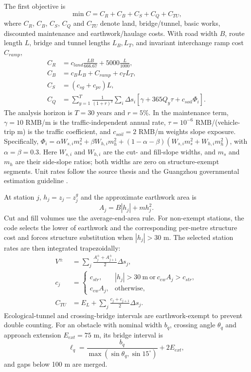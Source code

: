\documentclass[preprint,12pt]{elsarticle}
\begin{document}
The first objective is
\begin{equation}
\min C=C_R+C_B+C_S+C_Q+C_{TU},
\label{eq:lcc}
\end{equation}
where $C_R$, $C_B$, $C_S$, $C_Q$ and $C_{TU}$ denote land, bridge/tunnel, basic works, discounted maintenance and earthwork/haulage costs. With road width $B$, route length $L$, bridge and tunnel lengths $L_B,L_T$, and invariant interchange ramp cost $C_{ramp}$,
\begin{align}
C_R&=c_{land}\frac{LB}{666.67}+5000\frac{L}{1000},\\
C_B&=c_BL_B+C_{ramp}+c_TL_T,\\
C_S&=(c_{sg}+c_{pv})L,\label{eq:lccparts}\\
C_Q&=\sum_{y=1}^{T}\frac{1}{(1+r)^y}
\sum_i\Delta s_i[\gamma+365Q_y\tau+c_{soil}\Phi_i].
\end{align}
The analysis horizon is $T=30$ years and $r=5\%$. In the maintenance term, $\gamma=10$ RMB/m is the traffic-independent annual rate, $\tau=10^{-6}$ RMB/(vehicle-trip m) is the traffic coefficient, and $c_{soil}=2$ RMB/m weights slope exposure. Specifically, $\Phi_i=\alpha W_{s,i}m_s^2+\beta W_{h,i}m_h^2+(1-\alpha-\beta)(W_{s,i}m_s^2+W_{h,i}m_h^2)$, with $\alpha=\beta=0.3$. Here $W_{s,i}$ and $W_{h,i}$ are the cut- and fill-slope widths, and $m_s$ and $m_h$ are their side-slope ratios; both widths are zero on structure-exempt segments. Unit rates follow the source thesis and the Guangzhou governmental estimation guideline \cite{guangzhou2025}.

At station $j$, $h_j=z_j-z^g_j$ and the approximate earthwork area is
\begin{equation}
A_j=B|h_j|+m h_j^2.
\end{equation}
Cut and fill volumes use the average-end-area rule. For non-exempt stations, the code selects the lower of earthwork and the corresponding per-metre structure cost and forces structure substitution when $|h_j|>30$ m. The selected station rates are then integrated trapezoidally:
\begin{align}
V^{\pm}&=\sum_j\frac{A_j^{\pm}+A_{j+1}^{\pm}}{2}\Delta s_j,\\
c_j&=\begin{cases}
c_{str},& |h_j|>30~\mathrm{m}\ \text{or}\ c_{ew}A_j>c_{str},\\
c_{ew}A_j,&\text{otherwise},
\end{cases}\\
C_{TU}&=E_L+\sum_j\frac{c_j+c_{j+1}}{2}\Delta s_j.
\label{eq:earthwork}
\end{align}
Ecological-tunnel and crossing-bridge intervals are earthwork-exempt to prevent double counting. For an obstacle with nominal width $b_q$, crossing angle $\theta_q$ and approach extension $E_{ext}=75$ m, its bridge interval is
\begin{equation}
\ell_q=\frac{b_q}{\max(\sin\theta_q,\sin15^\circ)}+2E_{ext},
\end{equation}
and gaps below 100 m are merged.
\end{document}
